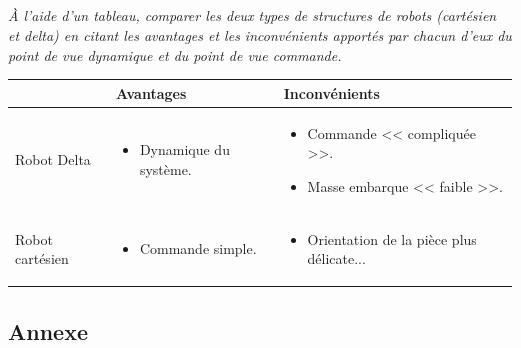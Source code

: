 \documentclass[10pt,fleqn]{article} %
\begin{document}
\fi

\subparagraph{\label{q}}\textit{À l’aide d’un tableau, comparer les deux types de structures de robots (cartésien et delta) en citant
les avantages et les inconvénients apportés par chacun d’eux du point de vue dynamique et du point de vue
commande.}
\ifprof ~\\
\begin{corrige}
\begin{tabular}{|l|p{.3\linewidth}|p{.3\linewidth}|}
\hline 
& Avantages & Inconvénients \\
\hline 
Robot Delta & 
\begin{itemize}
\item Dynamique du système.
\end{itemize}
&
\begin{itemize}
\item Commande << compliquée >>.
\item Masse embarque << faible >>.
\end{itemize} \\ \hline
Robot cartésien & 
\begin{itemize}
\item Commande simple.
\end{itemize}
&
\begin{itemize}
\item Orientation de la pièce plus délicate...
\end{itemize} \\ \hline
\end{tabular}


\end{corrige}
\else
\fi


\ifprof
\else
\newpage

\subsection*{Annexe}
\end{document}
